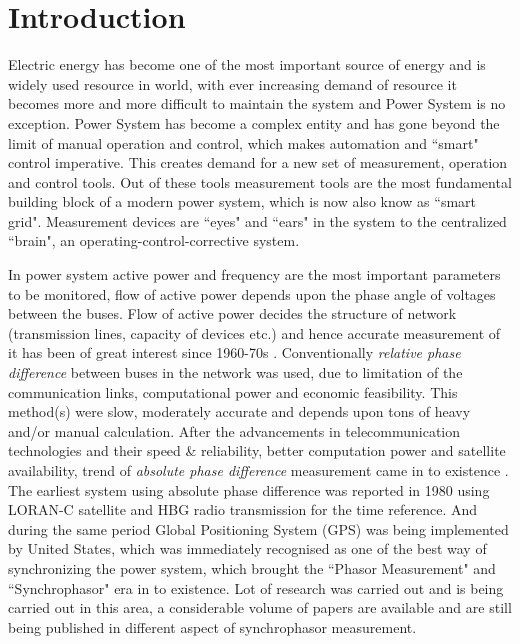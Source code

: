 \chapter{Introduction}
\setcounter{page}{1}

Electric energy has become one of the most important source of energy and is widely used resource in world, with ever increasing demand of resource it becomes more and more difficult to maintain the system and Power System is no exception. Power System has become a complex entity and has gone beyond the limit of manual operation and control, which makes automation and ``smart" control imperative. This creates demand for a new set of measurement, operation and control tools. Out of these tools measurement tools are the most fundamental building block of a modern power system, which is now also know as ``smart grid". Measurement devices are ``eyes" and ``ears" in the system to the centralized ``brain", an operating-control-corrective system.  

In power system active power and frequency are the most important parameters to be monitored, flow of active power depends upon the phase angle of voltages between the buses. Flow of active power decides the structure of network (transmission lines, capacity of devices etc.) and hence accurate measurement of it has been of great interest since 1960-70s \cite{agphadkebook}. Conventionally \textit{relative phase difference} between buses in the network was used, due to limitation of the communication links, computational power and  economic feasibility. This method(s) were slow, moderately accurate and depends upon tons of heavy and/or manual calculation. 
After the advancements in telecommunication technologies and their speed \& reliability, better computation power and satellite availability, trend of \textit{absolute phase difference} measurement came in to existence \cite{PMUhist}. The earliest system using absolute phase difference was reported in 1980 using LORAN-C satellite and HBG radio transmission for the time reference. And during the same period Global Positioning System (GPS) was being implemented by United States, which was immediately recognised as one of the best way of synchronizing the power system, which brought the ``Phasor Measurement" and ``Synchrophasor" era in to existence. Lot of research was carried out and is being carried out in this area, a considerable volume of papers are available and are still being published in different aspect of synchrophasor measurement.


